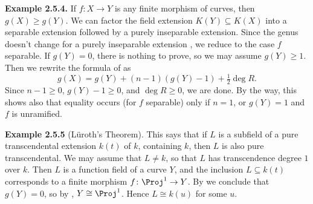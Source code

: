 {\medskip
\noindent\hypertarget{result-IV-2.5.4}{}\textbf{Example 2.5.4.} If $f\colon X\to Y$ is any finite morphism of curves, then $g(X)\geq g(Y)$. We can factor the field extension $K(Y)\subseteq K(X)$ into a separable extension followed by a purely inseparable extension. Since the genus doesn't change for a purely inseparable extension , we reduce to the case $f$ separable. If $g(Y)=0$, there is nothing to prove, so we may assume $g(Y)\geq1$. Then we rewrite the formula of  as
\[
g(X)=g(Y)+(n-1)(g(Y)-1)+\tfrac12\deg R.
\]
Since $n-1\geq0$, $g(Y)-1\geq0$, and $\deg R\geq0$, we are done. By the way, this shows also that equality occurs (for $f$ separable\EditionText{}) only if $n=1$, or $g(Y)=1$ and $f$ is unramified.

\medskip
\noindent\hypertarget{result-IV-2.5.5}{}\textbf{Example 2.5.5} (L\"uroth's Theorem). This says that if $L$ is a subfield of a pure transcendental extension $k(t)$ of $k$, containing $k$, then $L$ is also pure transcendental. We may assume that $L\ne k$, so that $L$ has transcendence degree $1$ over $k$. Then $L$ is a function field of a curve $Y$, and the inclusion $L\subseteq k(t)$ corresponds to a finite morphism $f\colon\Proj^1\to Y$. By  we conclude that $g(Y)=0$, so by , $Y\cong\Proj^1$. Hence $L\cong k(u)$ for some $u$.
}
